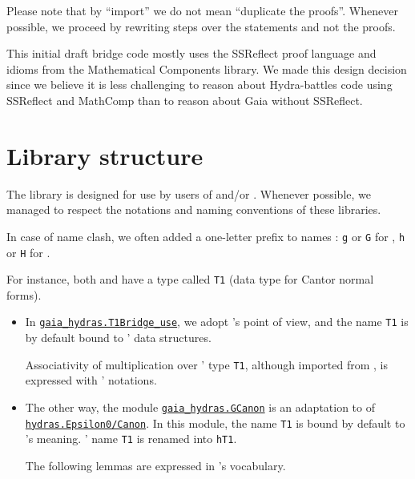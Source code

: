 Please note that by ``import'' we do not mean ``duplicate the proofs''.  Whenever possible, we proceed by rewriting steps over the statements and not the proofs. 



This initial draft bridge code mostly uses the SSReflect proof language
and idioms from the Mathematical Components library. We made this design
decision since we believe it is less challenging to reason about
Hydra-battles code using SSReflect and MathComp than to reason about
Gaia without SSReflect.



\section{Library structure}
The \gaiaHydras library is designed for use  by users of
\gaia and/or  \HydrasLib. Whenever possible, we managed to respect the notations and naming conventions of these libraries.

In case of name clash, we often added a one-letter prefix to names : \texttt{g} or \texttt{G} for \gaia, \texttt{h} or \texttt{H}
  for \HydrasLib.

For instance, both \gaia and \HydrasLib have a type called \texttt{T1} (data type for Cantor normal forms).
\begin{itemize}
\item In
  \href{../theories/html/gaia_hydras.T1Bridge_use.html}%
  {\texttt{gaia\_hydras.T1Bridge\_use}}, we adopt \HydrasLib's point of view, and the name \texttt{T1} is by default bound to
\HydrasLib' data structures.


Associativity of multiplication over \HydrasLib' type \texttt{T1},
although imported from \gaia, is expressed with \HydrasLib' notations.


\item The other way, the module \href{../theories/html/gaia_hydras.GCanon.html}%
  {\texttt{gaia\_hydras.GCanon}} is an adaptation to \gaia of
  \href{../theories/html/hydras.Epsilon0/Canon.html}%
  {\texttt{hydras.Epsilon0/Canon}}.
  In this module, the name \texttt{T1} is bound by default to \gaia's meaning. \HydrasLib' name \texttt{T1} is renamed into \texttt{hT1}.

  The following lemmas are expressed in \gaia's vocabulary.
  
\end{itemize}

